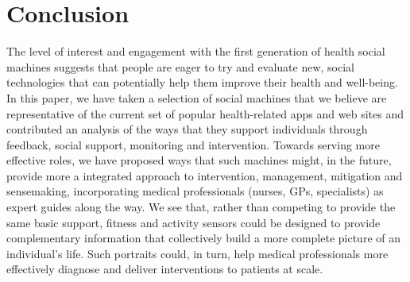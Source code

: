 \documentclass{sig-alternate}
\begin{document}

\section{Conclusion}

The level of interest and engagement with the first generation of
health social machines suggests that people are eager to try and
evaluate new, social technologies that can potentially help them
improve their health and well-being. In this paper, we have taken a
selection of social machines that we believe are representative of the
current set of popular health-related apps and web sites and
contributed an analysis of the ways that they support individuals
through feedback, social support, monitoring and intervention. Towards
serving more effective roles, we have proposed ways that such machines
might, in the future, provide more a integrated approach to
intervention, management, mitigation and sensemaking, incorporating
medical professionals (nurses, GPs, specialists) as expert guides
along the way.  We see that, rather than competing to provide the same
basic support, fitness and activity sensors could be designed to
provide complementary information that collectively build a more
complete picture of an individual's life.  Such portraits could, in
turn, help medical professionals more effectively diagnose and deliver
interventions to patients at scale.


\end{document}
